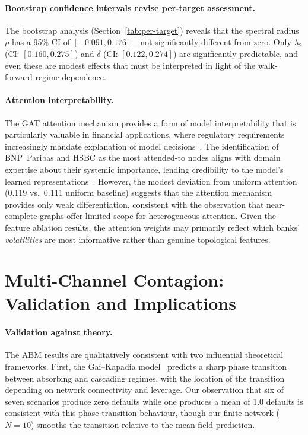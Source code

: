 \paragraph{Bootstrap confidence intervals revise per-target assessment.}
The bootstrap analysis (Section~\ref{tab:per-target}) reveals that the spectral radius $\rho$ has a 95\% CI of $[-0.091, 0.176]$---not significantly different from zero. Only $\lambda_2$ (CI: $[0.160, 0.275]$) and $\delta$ (CI: $[0.122, 0.274]$) are significantly predictable, and even these are modest effects that must be interpreted in light of the walk-forward regime dependence.

\paragraph{Attention interpretability.}
The GAT attention mechanism provides a form of model interpretability that is particularly valuable in financial applications, where regulatory requirements increasingly mandate explanation of model decisions~\cite{bisias2012survey}. The identification of BNP~Paribas and HSBC as the most attended-to nodes aligns with domain expertise about their systemic importance, lending credibility to the model's learned representations~\cite{haldane2011systemic}. However, the modest deviation from uniform attention (0.119 vs.\ 0.111 uniform baseline) suggests that the attention mechanism provides only weak differentiation, consistent with the observation that near-complete graphs offer limited scope for heterogeneous attention. Given the feature ablation results, the attention weights may primarily reflect which banks' \emph{volatilities} are most informative rather than genuine topological features.


\section{Multi-Channel Contagion: Validation and Implications}
\label{sec:contagion-discussion}

\paragraph{Validation against theory.}
The ABM results are qualitatively consistent with two influential theoretical frameworks. First, the Gai--Kapadia model~\cite{gai2010contagion} predicts a sharp phase transition between absorbing and cascading regimes, with the location of the transition depending on network connectivity and leverage. Our observation that six of seven scenarios produce zero defaults while one produces a mean of 1.0 defaults is consistent with this phase-transition behaviour, though our finite network ($N=10$) smooths the transition relative to the mean-field prediction.

